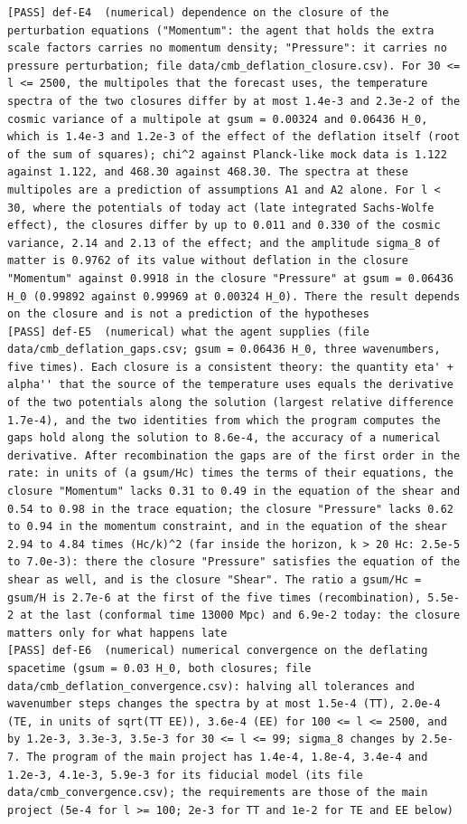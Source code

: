 \documentclass[
  10pt,
]{article}
\begin{document}
\begin{verbatim}
[PASS] def-E4  (numerical) dependence on the closure of the perturbation equations ("Momentum": the agent that holds the extra scale factors carries no momentum density; "Pressure": it carries no pressure perturbation; file data/cmb_deflation_closure.csv). For 30 <= l <= 2500, the multipoles that the forecast uses, the temperature spectra of the two closures differ by at most 1.4e-3 and 2.3e-2 of the cosmic variance of a multipole at gsum = 0.00324 and 0.06436 H_0, which is 1.4e-3 and 1.2e-3 of the effect of the deflation itself (root of the sum of squares); chi^2 against Planck-like mock data is 1.122 against 1.122, and 468.30 against 468.30. The spectra at these multipoles are a prediction of assumptions A1 and A2 alone. For l < 30, where the potentials of today act (late integrated Sachs-Wolfe effect), the closures differ by up to 0.011 and 0.330 of the cosmic variance, 2.14 and 2.13 of the effect; and the amplitude sigma_8 of matter is 0.9762 of its value without deflation in the closure "Momentum" against 0.9918 in the closure "Pressure" at gsum = 0.06436 H_0 (0.99892 against 0.99969 at 0.00324 H_0). There the result depends on the closure and is not a prediction of the hypotheses
[PASS] def-E5  (numerical) what the agent supplies (file data/cmb_deflation_gaps.csv; gsum = 0.06436 H_0, three wavenumbers, five times). Each closure is a consistent theory: the quantity eta' + alpha'' that the source of the temperature uses equals the derivative of the two potentials along the solution (largest relative difference 1.7e-4), and the two identities from which the program computes the gaps hold along the solution to 8.6e-4, the accuracy of a numerical derivative. After recombination the gaps are of the first order in the rate: in units of (a gsum/Hc) times the terms of their equations, the closure "Momentum" lacks 0.31 to 0.49 in the equation of the shear and 0.54 to 0.98 in the trace equation; the closure "Pressure" lacks 0.62 to 0.94 in the momentum constraint, and in the equation of the shear 2.94 to 4.84 times (Hc/k)^2 (far inside the horizon, k > 20 Hc: 2.5e-5 to 7.0e-3): there the closure "Pressure" satisfies the equation of the shear as well, and is the closure "Shear". The ratio a gsum/Hc = gsum/H is 2.7e-6 at the first of the five times (recombination), 5.5e-2 at the last (conformal time 13000 Mpc) and 6.9e-2 today: the closure matters only for what happens late
[PASS] def-E6  (numerical) numerical convergence on the deflating spacetime (gsum = 0.03 H_0, both closures; file data/cmb_deflation_convergence.csv): halving all tolerances and wavenumber steps changes the spectra by at most 1.5e-4 (TT), 2.0e-4 (TE, in units of sqrt(TT EE)), 3.6e-4 (EE) for 100 <= l <= 2500, and by 1.2e-3, 3.3e-3, 3.5e-3 for 30 <= l <= 99; sigma_8 changes by 2.5e-7. The program of the main project has 1.4e-4, 1.8e-4, 3.4e-4 and 1.2e-3, 4.1e-3, 5.9e-3 for its fiducial model (its file data/cmb_convergence.csv); the requirements are those of the main project (5e-4 for l >= 100; 2e-3 for TT and 1e-2 for TE and EE below)

\end{verbatim}
\end{document}
